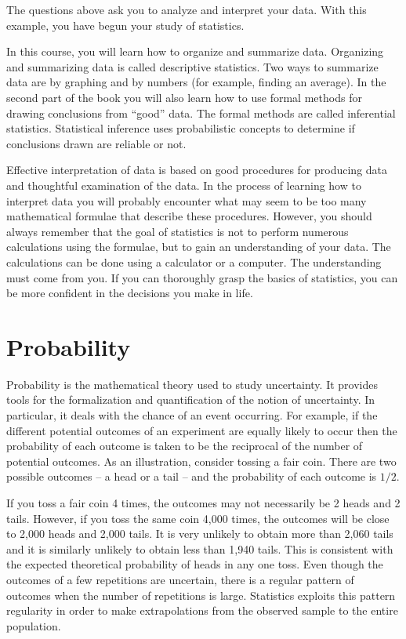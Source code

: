 \documentclass[]{krantz}
\theoremstyle{definition}
\theoremstyle{definition}
\theoremstyle{definition}
\theoremstyle{remark}
\begin{document}
The questions above ask you to analyze and interpret your data. With
this example, you have begun your study of statistics.

In this course, you will learn how to organize and summarize data.
Organizing and summarizing data is called descriptive statistics. Two
ways to summarize data are by graphing and by numbers (for example,
finding an average). In the second part of the book you will also learn
how to use formal methods for drawing conclusions from ``good'' data.
The formal methods are called inferential statistics. Statistical
inference uses probabilistic concepts to determine if conclusions drawn
are reliable or not.

Effective interpretation of data is based on good procedures for
producing data and thoughtful examination of the data. In the process of
learning how to interpret data you will probably encounter what may seem
to be too many mathematical formulae that describe these procedures.
However, you should always remember that the goal of statistics is not
to perform numerous calculations using the formulae, but to gain an
understanding of your data. The calculations can be done using a
calculator or a computer. The understanding must come from you. If you
can thoroughly grasp the basics of statistics, you can be more confident
in the decisions you make in life.

\section{Probability}\label{probability}

Probability is the mathematical theory used to study uncertainty. It
provides tools for the formalization and quantification of the notion of
uncertainty. In particular, it deals with the chance of an event
occurring. For example, if the different potential outcomes of an
experiment are equally likely to occur then the probability of each
outcome is taken to be the reciprocal of the number of potential
outcomes. As an illustration, consider tossing a fair coin. There are
two possible outcomes -- a head or a tail -- and the probability of each
outcome is \(1/2\).

If you toss a fair coin 4 times, the outcomes may not necessarily be 2
heads and 2 tails. However, if you toss the same coin 4,000 times, the
outcomes will be close to 2,000 heads and 2,000 tails. It is very
unlikely to obtain more than 2,060 tails and it is similarly unlikely to
obtain less than 1,940 tails. This is consistent with the expected
theoretical probability of heads in any one toss. Even though the
outcomes of a few repetitions are uncertain, there is a regular pattern
of outcomes when the number of repetitions is large. Statistics exploits
this pattern regularity in order to make extrapolations from the
observed sample to the entire population.
\end{document}
